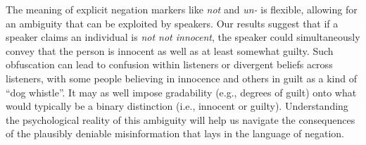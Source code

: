 \documentclass[floatsintext,doc]{apa6}
\let\rmarkdownfootnote\footnote%
\def\footnote{\protect\rmarkdownfootnote}
\begin{document}



The meaning of explicit negation markers like \emph{not} and \emph{un-} is flexible, allowing for an ambiguity that can be exploited by speakers.
Our results suggest that if a speaker claims an individual is \emph{not not innocent}, the speaker could simultaneously convey that the person is innocent as well as at least somewhat guilty.
Such obfuscation can lead to confusion within listeners or divergent beliefs across listeners, with some people believing in innocence and others in guilt as a kind of ``dog whistle''.
It may as well impose gradability (e.g., degrees of guilt) onto what would typically be a binary distinction (i.e., innocent or guilty). 
Understanding the psychological reality of this ambiguity will help us navigate the consequences of the plausibly deniable misinformation that lays in the language of negation.
\end{document}
